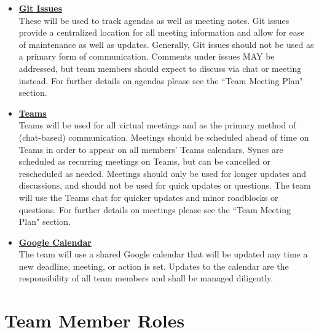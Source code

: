 \documentclass{article}
\begin{document}
\begin{itemize}
	\item \textbf{\underline{Git Issues}} \\
	These will be used to track agendas as well as meeting notes. 
	Git issues provide a centralized location for all meeting information and allow for ease of maintenance as well as updates. 
	Generally, Git issues should not be used as a primary form of communication.
	Comments under issues MAY be addressed, but team members should expect to discuss via chat or meeting instead.
	For further details on agendas please see the ``Team Meeting Plan" section.

	\item \textbf{\underline{Teams}} \\
	Teams will be used for all virtual meetings and as the primary method of (chat-based) communication.
	Meetings should be scheduled ahead of time on Teams in order to appear on all members' Teams calendars.
	Syncs are scheduled as recurring meetings on Teams, but can be cancelled or rescheduled as needed.
	Meetings should only be used for longer updates and discussions, and should not be used for quick updates or questions.
	The team will use the Teams chat for quicker updates and minor roadblocks or questions.
	For further details on meetings please see the ``Team Meeting Plan" section.
	
	\item \textbf{\underline{Google Calendar}} \\
	The team will use a shared Google calendar that will be updated any time a new deadline, meeting, or action is set. 
	Updates to the calendar are the responsibility of all team members and shall be managed diligently.

\end{itemize}



\section{Team Member Roles}
\end{document}
